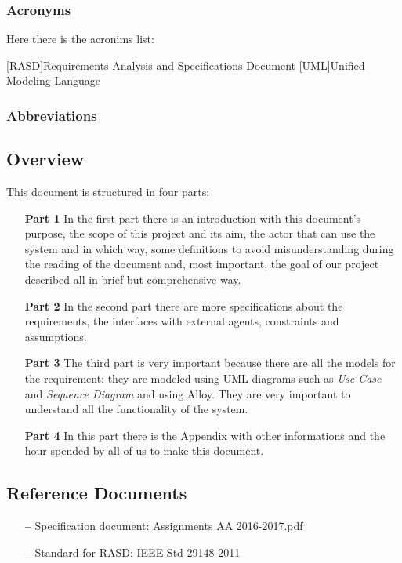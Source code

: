 \subsubsection{Acronyms} \label{acr}
Here there is the acronims list:

\begin{acronym}[RASD] %

[RASD]{Requirements Analysis and Specifications Document}
[UML]{Unified Modeling Language}

\end{acronym}

\subsubsection{Abbreviations} \label{abbre}


\subsection{Overview} \label{subsec:overview}
This document is structured in four parts:
\begin{itemize}
\item[\textbf{Part 1}]In the first part there is an introduction with this document’s purpose, the scope of this project and its aim, the actor that can use  the system and in which way, some definitions to avoid misunderstanding during the reading of the document and, most important, the goal of our project described all in brief but comprehensive way.  
\item[\textbf{Part 2}]In the second part there are more specifications about the requirements, the interfaces with external agents, constraints and assumptions.
\item[\textbf{Part 3}]The third part is very important because there are all the models for the requirement: they are modeled using UML diagrams such as \emph{Use Case} and \emph{Sequence Diagram} and using Alloy. They are very important to understand all the functionality of the system.  
\item[\textbf{Part 4}]In this part there is the Appendix with other informations and the hour spended by all of us to make this document.
\end{itemize}

\subsection{Reference Documents} \label{ref-doc}
\begin{itemize}
\item[\textbf{--}] Specification document: Assignments AA 2016-2017.pdf
\item[\textbf{--}]Standard for RASD: IEEE Std 29148-2011
\end{itemize}



